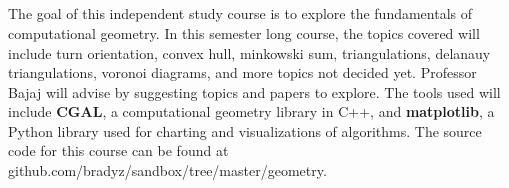\documentclass[10pt]{article}
\title{\textmd{\bf \Class\\}}
\author{\small \normalfont{Advisor: Chandrajit Bajaj} \\
\small \normalfont{\StudentName}}
\date{}
\begin{document}
\maketitle \thispagestyle{empty}

 \newline \\
\indent The goal of this independent study course is to explore the fundamentals of computational geometry. In this semester long course, the topics covered will include turn orientation, convex hull, minkowski sum, triangulations, delanauy triangulations, voronoi diagrams, and more topics not decided yet. Professor Bajaj will advise by suggesting topics and papers to explore. The tools used will include \textbf{CGAL}, a computational geometry library in C++, and \textbf{matplotlib}, a Python library used for charting and visualizations of algorithms. The source code for this course can be found at github.com/bradyz/sandbox/tree/master/geometry. \newline

\newpage
\end{document}
